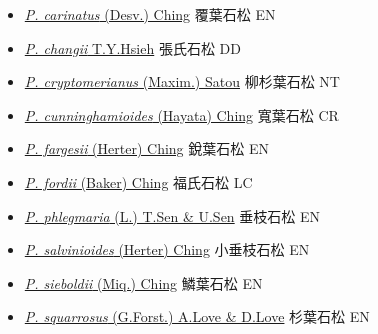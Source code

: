 \begin{itemize}
  \begin{itemize}
        \item[] \href{http://www.theplantlist.org/tpl1.1/search?q=Phlegmariurus+carinatus}{\textit{P. carinatus} (Desv.) Ching}   覆葉石松   EN
        \item[] \href{http://www.theplantlist.org/tpl1.1/search?q=Phlegmariurus+changii}{\textit{P. changii} T.Y.Hsieh}   張氏石松   DD
        \item[] \href{http://www.theplantlist.org/tpl1.1/search?q=Phlegmariurus+cryptomerianus}{\textit{P. cryptomerianus} (Maxim.) Satou}   柳杉葉石松   NT
        \item[] \href{http://www.theplantlist.org/tpl1.1/search?q=Phlegmariurus+cunninghamioides}{\textit{P. cunninghamioides} (Hayata) Ching}   寬葉石松   CR
        \item[] \href{http://www.theplantlist.org/tpl1.1/search?q=Phlegmariurus+fargesii}{\textit{P. fargesii} (Herter) Ching}   銳葉石松   EN
        \item[] \href{http://www.theplantlist.org/tpl1.1/search?q=Phlegmariurus+fordii}{\textit{P. fordii} (Baker) Ching}   福氏石松   LC
        \item[] \href{http://www.theplantlist.org/tpl1.1/search?q=Phlegmariurus+phlegmaria}{\textit{P. phlegmaria} (L.) T.Sen \& U.Sen}   垂枝石松   EN
        \item[] \href{http://www.theplantlist.org/tpl1.1/search?q=Phlegmariurus+salvinioides}{\textit{P. salvinioides} (Herter) Ching}   小垂枝石松   EN
        \item[] \href{http://www.theplantlist.org/tpl1.1/search?q=Phlegmariurus+sieboldii}{\textit{P. sieboldii} (Miq.) Ching}   鱗葉石松   EN
        \item[] \href{http://www.theplantlist.org/tpl1.1/search?q=Phlegmariurus+squarrosus}{\textit{P. squarrosus} (G.Forst.) A.Love \& D.Love}   杉葉石松   EN
  \end{itemize}
  \end{itemize}
